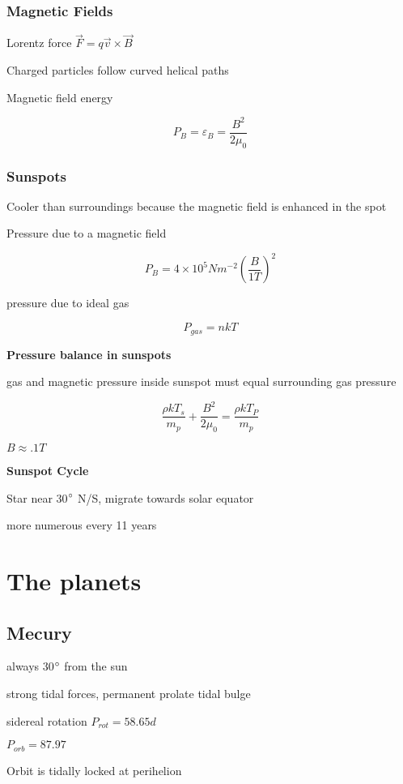 \documentclass{article}
\begin{document}
\subsubsection{Magnetic Fields}
\begin{list}{-}{}
\item Lorentz force \(\vec{F} = q\vec{v}\times\vec{B}\)
\item Charged particles follow curved helical paths
\item Magnetic field energy
\item \[P_B = \varepsilon_B = \frac{B^2}{2\mu_0}\]
\end{list}

\subsubsection{Sunspots}
\begin{list}{-}{}
\item Cooler than surroundings because the magnetic field is enhanced in the spot
\item Pressure due to a magnetic field
\item \[P_B = 4\times10^5 Nm^{-2} (\frac{B}{1T})^2\]
\item pressure due to ideal gas
\item \[P_{gas} = nkT\]
\end{list}
\noindent \textbf{\large Pressure balance in sunspots}
\begin{list}{-}{}
\item gas and magnetic pressure inside sunspot must equal surrounding gas pressure 
\item \[\frac{\rho kT_s}{m_p} + \frac{B^2}{2\mu_0} = \frac{\rho kT_P}{m_p}\]
\item \(B \approx .1 T\)
\end{list}

\noindent \textbf{\large Sunspot Cycle}
\begin{list}{-}{}
\item Star near 30$\degree$ N/S, migrate towards solar equator 
\item more numerous every 11 years 
\end{list}

\setcounter{section}{9}
\section{The planets}
\subsection{Mecury}
\begin{list}{-}{}
\item always 30\(\degree\) from the sun
\item strong tidal forces, permanent prolate tidal bulge
\item sidereal rotation \(P_{rot} = 58.65d\)
\item \(P_{orb} = 87.97\)
\item Orbit is tidally locked at perihelion
\end{list}
\end{document}
